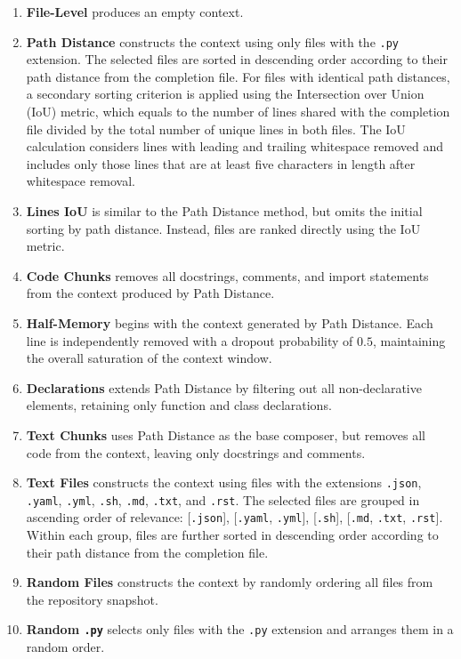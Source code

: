 \begin{enumerate}
    \item \textbf{File-Level} produces an empty context.
    \item \textbf{Path Distance} constructs the context using only files with the \texttt{.py} extension. The selected files are sorted in descending order according to their path distance from the completion file. For files with identical path distances, a secondary sorting criterion is applied using the Intersection over Union (IoU) metric, which equals to the number of lines shared with the completion file divided by the total number of unique lines in both files. The IoU calculation considers lines with leading and trailing whitespace removed and includes only those lines that are at least five characters in length after whitespace removal.
    \item \textbf{Lines IoU} is similar to the Path Distance method, but omits the initial sorting by path distance. Instead, files are ranked directly using the IoU metric.
    \item \textbf{Code Chunks} removes all docstrings, comments, and import statements from the context produced by Path Distance.
    \item \textbf{Half-Memory} begins with the context generated by Path Distance. Each line is independently removed with a dropout probability of \(0.5\), maintaining the overall saturation of the context window.
    \item \textbf{Declarations} extends Path Distance by filtering out all non-declarative elements, retaining only function and class declarations.
    \item \textbf{Text Chunks} uses Path Distance as the base composer, but removes all code from the context, leaving only docstrings and comments.
    \item \textbf{Text Files} constructs the context using files with the extensions \texttt{.json}, \texttt{.yaml}, \texttt{.yml}, \texttt{.sh}, \texttt{.md}, \texttt{.txt}, and \texttt{.rst}. The selected files are grouped in ascending order of relevance: [\texttt{.json}], [\texttt{.yaml}, \texttt{.yml}], [\texttt{.sh}], [\texttt{.md}, \texttt{.txt}, \texttt{.rst}]. Within each group, files are further sorted in descending order according to their path distance from the completion file.
    \item \textbf{Random Files} constructs the context by randomly ordering all files from the repository snapshot.
    \item \textbf{Random \texttt{.py}} selects only files with the \texttt{.py} extension and arranges them in a random order.

\end{enumerate}
